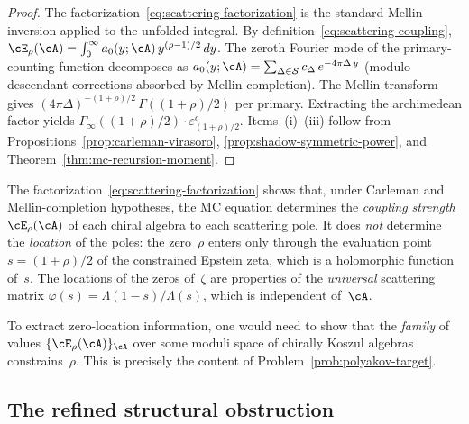 \begin{proof}
The factorization~\eqref{eq:scattering-factorization} is the
standard Mellin inversion applied to the unfolded integral.
By definition~\eqref{eq:scattering-coupling},
$\cE_\rho(\cA) = \int_0^\infty a_0(y;\cA)\,
y^{(\rho-1)/2}\,dy$.
The zeroth Fourier mode of the primary-counting function
decomposes as
$a_0(y;\cA) = \sum_{\Delta\in\mathcal{S}}
c_\Delta\,e^{-4\pi\Delta\,y}$ (modulo descendant corrections
absorbed by Mellin completion).
The Mellin transform gives
$(4\pi\Delta)^{-(1+\rho)/2}\,\Gamma((1{+}\rho)/2)$ per primary.
Extracting the archimedean factor yields
$\Gamma_\infty((1{+}\rho)/2) \cdot \varepsilon^c_{(1+\rho)/2}$.
Items~(i)--(iii) follow from
Propositions~\ref{prop:carleman-virasoro},
\ref{prop:shadow-symmetric-power},
and Theorem~\ref{thm:mc-recursion-moment}.
\end{proof}

\begin{remark}%
\label{rem:factorization-scope}%
%
The factorization~\eqref{eq:scattering-factorization} shows
that, under Carleman and Mellin-completion hypotheses, the MC
equation determines the \emph{coupling strength} $\cE_\rho(\cA)$
of each chiral algebra to each scattering pole. It does \emph{not}
determine the \emph{location} of the poles: the zero~$\rho$ enters
only through the evaluation
point $s = (1{+}\rho)/2$ of the constrained Epstein zeta,
which is a holomorphic function of~$s$. The locations of the
zeros of~$\zeta$ are properties of the \emph{universal}
scattering matrix $\varphi(s) = \Lambda(1{-}s)/\Lambda(s)$,
which is independent of~$\cA$.

To extract zero-location information, one would need to show
that the \emph{family} of values
$\{\cE_\rho(\cA)\}_\cA$ over some moduli space of
chirally Koszul algebras constrains~$\rho$. This is
precisely the content of Problem~\ref{prob:polyakov-target}.
\end{remark}

\subsection{The refined structural obstruction}%
\label{subsec:refined-structural-obstruction}

